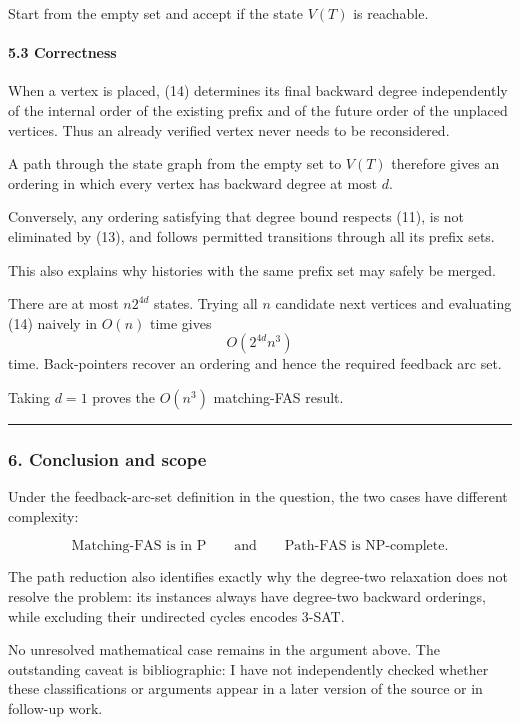 \documentclass[
  11pt,
  a4paper,
]{article}
\begin{document}
Start from the empty set and accept if the state \(V(T)\) is reachable.

\paragraph{5.3 Correctness}\label{correctness}

When a vertex is placed, (14) determines its final backward degree
independently of the internal order of the existing prefix and of the
future order of the unplaced vertices. Thus an already verified vertex
never needs to be reconsidered.

A path through the state graph from the empty set to \(V(T)\) therefore
gives an ordering in which every vertex has backward degree at most
\(d\).

Conversely, any ordering satisfying that degree bound respects (11), is
not eliminated by (13), and follows permitted transitions through all
its prefix sets.

This also explains why histories with the same prefix set may safely be
merged.

There are at most \(n2^{4d}\) states. Trying all \(n\) candidate next
vertices and evaluating (14) naively in \(O(n)\) time gives \[
O(2^{4d}n^3)
\] time. Back-pointers recover an ordering and hence the required
feedback arc set.

Taking \(d=1\) proves the \(O(n^3)\) matching-FAS result.

\begin{center}\rule{0.5\linewidth}{0.5pt}\end{center}

\subsubsection{6. Conclusion and scope}\label{conclusion-and-scope}

Under the feedback-arc-set definition in the question, the two cases
have different complexity:

\[
\boxed{\text{Matching-FAS is in P}}
\qquad\text{and}\qquad
\boxed{\text{Path-FAS is NP-complete}.}
\]

The path reduction also identifies exactly why the degree-two relaxation
does not resolve the problem: its instances always have degree-two
backward orderings, while excluding their undirected cycles encodes
3-SAT.

No unresolved mathematical case remains in the argument above. The
outstanding caveat is bibliographic: I have not independently checked
whether these classifications or arguments appear in a later version of
the source or in follow-up work.
\end{document}
